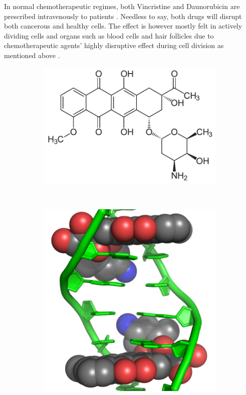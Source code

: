 \documentclass[pdftex,12pt,a4paper]{report}
\begin{document}
In normal chemotherapeutic regimes, both Vincristine and Daunorubicin are prescribed intravenously to patients \cite{skeel2011handbook}. Needless to say, both drugs will disrupt both cancerous and healthy cells. The effect is however mostly felt in actively dividing cells and organs such as blood cells and hair follicles due to chemotherapeutic agents' highly disruptive effect during cell division as mentioned above \cite{skeel2011handbook, mayo2018chemotherapy}.

\begin{figure}[H]
\begin{subfigure}{.55\textwidth}
  \centering
  \includegraphics[width=\textwidth]{images/daunorubicin}
  \caption{}
  \label{fig:dauno}
\end{subfigure}
~
\begin{subfigure}{.4\textwidth}
  \centering
  \includegraphics[width=\textwidth]{images/doxorubicin_dna}

\end{subfigure}
\end{figure}
\end{document}
